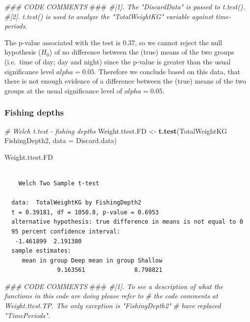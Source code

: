 \documentclass[
]{book}
\newenvironment{Shaded}{\begin{snugshade}}{\end{snugshade}}
\newcommand{\AlertTok}[1]{\textcolor[rgb]{0.94,0.16,0.16}{#1}}
\newcommand{\CommentTok}[1]{\textcolor[rgb]{0.56,0.35,0.01}{\textit{#1}}}
\newcommand{\DataTypeTok}[1]{\textcolor[rgb]{0.13,0.29,0.53}{#1}}
\newcommand{\KeywordTok}[1]{\textcolor[rgb]{0.13,0.29,0.53}{\textbf{#1}}}
\newcommand{\NormalTok}[1]{#1}
\newcommand{\OperatorTok}[1]{\textcolor[rgb]{0.81,0.36,0.00}{\textbf{#1}}}
\newcommand{\StringTok}[1]{\textcolor[rgb]{0.31,0.60,0.02}{#1}}
\begin{document}
\begin{Shaded}
\begin{Highlighting}[]
\CommentTok{### CODE COMMENTS }\AlertTok{###}
\CommentTok{#[1]. The "DiscardData" is passed to t.test(). }
\CommentTok{#[2]. t.test() is used to analyze the "TotalWeightKG" variable against time-periods. }
\end{Highlighting}
\end{Shaded}

The p-value associated with the test is \(0.37\), so we cannot reject the null hypothesis (\(H_0\)) of no difference between the (true) means of the two groups (i.e.~time of day; day and night) since the p-value is greater than the usual significance level \(alpha = 0.05\). Therefore we conclude based on this data, that there is not enough evidence of a difference between the (true) means of the two groups at the usual significance level of \(alpha = 0.05\).

\hypertarget{fishing-depths-1}{%
\subsubsection{Fishing depths}\label{fishing-depths-1}}

\begin{Shaded}
\begin{Highlighting}[]
\CommentTok{# Welch t.test - fishing depths}
\NormalTok{Weight.ttest.FD <-}\StringTok{ }\KeywordTok{t.test}\NormalTok{(TotalWeightKG }\OperatorTok{~}\StringTok{ }\NormalTok{FishingDepth2,}
  \DataTypeTok{data =}\NormalTok{ Discard.data)}

\NormalTok{Weight.ttest.FD}
\end{Highlighting}
\end{Shaded}

\begin{verbatim}
  
    Welch Two Sample t-test
  
  data:  TotalWeightKG by FishingDepth2
  t = 0.39181, df = 1050.8, p-value = 0.6953
  alternative hypothesis: true difference in means is not equal to 0
  95 percent confidence interval:
   -1.461899  2.191380
  sample estimates:
     mean in group Deep mean in group Shallow 
               9.163561              8.798821
\end{verbatim}

\begin{Shaded}
\begin{Highlighting}[]
\CommentTok{### CODE COMMENTS }\AlertTok{###}
\CommentTok{#[1]. To see a description of what the functions in this code are doing please refer to}
\CommentTok{#     the code comments at Weight.ttest.TP. The only exception is "FishingDepth2" }
\CommentTok{#     have replaced "TimePeriods". }
\end{Highlighting}
\end{Shaded}
\end{document}
